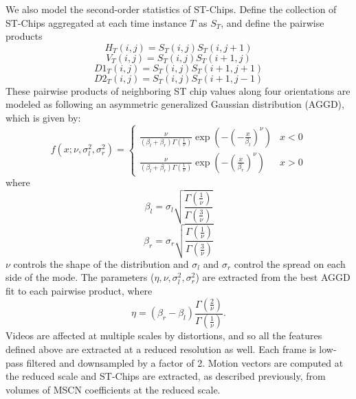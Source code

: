 \documentclass[conference]{IEEEtran}
\begin{document}
We also model the second-order statistics of ST-Chips.  Define the collection of ST-Chips aggregated at each time instance $T$ as $S_T$, and define the pairwise products
\begin{equation}
H_T(i,j) = S_T(i,j)S_T(i,j+1)
\end{equation}
\begin{equation}
V_T(i,j) = S_T(i,j)S_T(i+1,j)
\end{equation}
\begin{equation}
D1_T(i,j) = S_T(i,j)S_T(i+1,j+1)
\end{equation}
\begin{equation}
D2_T(i,j) = S_T(i,j)S_T(i+1,j-1)
\end{equation}
These pairwise products of neighboring ST chip values along four orientations are modeled as following an asymmetric generalized Gaussian distribution (AGGD), which is given by:
\begin{equation}
f(x;\nu,\sigma_l^2,\sigma_r^2) = \begin{cases}
\frac{\nu}{(\beta_l+\beta_r)\Gamma (\frac{1}{\nu})} \exp(-(-\frac{x}{\beta_l})^\nu) &  x<0 \\
\frac{\nu}{(\beta_l+\beta_r)\Gamma (\frac{1}{\nu})} \exp(-(\frac{x}{\beta_r})^\nu) &  x>0 
\end{cases} 
\end{equation}
where
\begin{equation}
\beta_l = \sigma_l \sqrt{\frac{\Gamma(\frac{1}{\nu})}{\Gamma(\frac{3}{\nu})}}
\end{equation}
\begin{equation}
\beta_r = \sigma_r \sqrt{\frac{\Gamma(\frac{1}{\nu})}{\Gamma(\frac{3}{\nu})}}
\end{equation}
$\nu$ controls the shape of the distribution and $\sigma_l$ and $\sigma_r$ control the spread on each side of the mode. The parameters ($\eta,\nu,\sigma_l^2,\sigma_r^2$) are extracted from the best AGGD fit to each pairwise product, where 
\begin{equation}
\eta = (\beta_r-\beta_l) \frac{\Gamma(\frac{2}{\nu})}{\Gamma(\frac{1}{\nu})}.
\end{equation}
Videos are affected at multiple scales by distortions, and so all the features defined above are extracted at a reduced resolution as well. Each frame is low-pass filtered and downsampled by a factor of 2. Motion vectors are computed at the reduced scale and ST-Chips are extracted, as described previously, from volumes of MSCN coefficients at the reduced scale.
\end{document}
